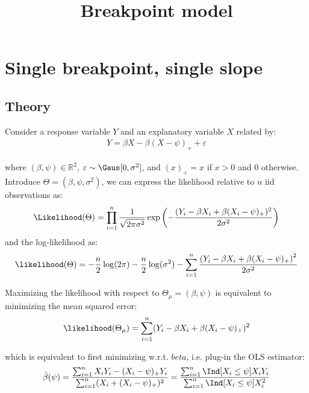 \documentclass[12pt]{article}
\date{}
\title{Breakpoint model}
\newcommand\Real{\mathbb{R}}
\begin{document}
\maketitle

\section{Single breakpoint, single slope}
\label{sec:orgec88a0a}

\subsection{Theory}
\label{sec:org338d0d1}

Consider a response variable \(Y\) and an explanatory variable \(X\)
related by:
\begin{align*}
Y = \beta X - \beta (X - \psi)_+ + \varepsilon
\end{align*}

\noindent where \((\beta,\psi) \in \Real^2\), \(\varepsilon
\sim \Gaus[0,\sigma^2]\), and \((x)_+=x\) if \(x>0\) and 0
otherwise. Introduce \(\Theta = (\beta,\psi,\sigma^2)\), we can
express the likelihood relative to \(n\) iid observations as:
\begin{align*}
\Likelihood(\Theta) = \prod_{i=1}^n \frac{1}{\sqrt{2\pi\sigma^2}}\exp\left(-\frac{(Y_i - \beta X_i + \beta (X_i - \psi)_+)^2}{2\sigma^2}\right)
\end{align*}
and the log-likelihood as:
\begin{align*}
\likelihood(\Theta) = - \frac{n}{2} \log(2\pi) - \frac{n}{2} \log(\sigma^2) - \sum_{i=1}^n \frac{\left(Y_i - \beta X_i + \beta (X_i - \psi)_+\right)^2}{2\sigma^2}
\end{align*}

\noindent Maximizing the likelihood with respect to \(\Theta_\mu =
(\beta,\psi)\) is equivalent to minimizing the mean squared
error:
\begin{align*}
\likelihood(\Theta_\mu) = \sum_{i=1}^n (Y_i - \beta X_i + \beta (X_i - \psi)_+)^2
\end{align*}

\noindent which is equivalent to first minimizing
w.r.t. \(beta\), i.e. plug-in the OLS estimator:
\begin{align*}
\tilde{\beta}(\psi) &= \frac{\sum_{i=1}^n X_i Y_i - (X_i - \psi)_+ Y_i}{\sum_{i=1}^n (X_i + (X_i - \psi)_+)^2} = \frac{\sum_{i=1}^n \Ind[X_i \leq \psi] X_i Y_i}{\sum_{i=1}^n \Ind[X_i \leq \psi] X^2_i} \\
\end{align*}
\end{document}
